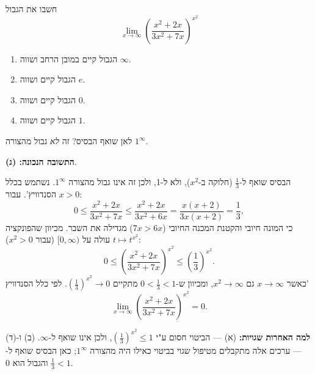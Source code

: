 
\begin{question}
חשבו את הגבול
\[
\lim_{x\to\infty}\left(\frac{x^2+2x}{3x^2+7x}\right)^{x^2}
\]
\begin{enumerate}
  \item הגבול קיים במובן הרחב ושווה $\infty$.
  \item הגבול קיים ושווה $e$.
  \item הגבול קיים ושווה $0$.
  \item הגבול קיים ושווה $1$.
\end{enumerate}
\end{question}

\begin{hint}
לאן שואף הבסיס? זה \emph{לא} גבול מהצורה $1^\infty$.
\end{hint}

\begin{solution}
\textbf{התשובה הנכונה: (ג)}.

הבסיס שואף ל-$\frac13$ (חלוקה ב-$x^2$), ולא ל-1, ולכן זה אינו גבול מהצורה $1^\infty$. נשתמש בכלל הסנדוויץ'. עבור $x>0$:
\[
0\le\frac{x^2+2x}{3x^2+7x}\le\frac{x^2+2x}{3x^2+6x}=\frac{x(x+2)}{3x(x+2)}=\frac13 ,
\]
כי המונה חיובי והקטנת המכנה החיובי ($7x>6x$) מגדילה את השבר. מכיוון שהפונקציה $t\mapsto t^{x^2}$ עולה על $[0,\infty)$ (עבור $x^2>0$):
\[
0\le\left(\frac{x^2+2x}{3x^2+7x}\right)^{x^2}\le\left(\frac13\right)^{x^2}.
\]
כאשר $x\to\infty$ גם $x^2\to\infty$, ומכיוון ש-$0<\frac13<1$ מתקיים $\left(\frac13\right)^{x^2}\to0$. לפי כלל הסנדוויץ'
\[
\lim_{x\to\infty}\left(\frac{x^2+2x}{3x^2+7x}\right)^{x^2}=\boxed{0}.
\]

\textbf{למה האחרות שגויות:} (א) — הביטוי חסום ע"י $\left(\frac13\right)^{x^2}\le1$, ולכן אינו שואף ל-$\infty$. (ב) ו-(ד) — ערכים אלה מתקבלים מטיפול שגוי בביטוי כאילו היה מהצורה $1^\infty$; כאן הבסיס שואף ל-$\frac13<1$ והגבול הוא 0.
\end{solution}
